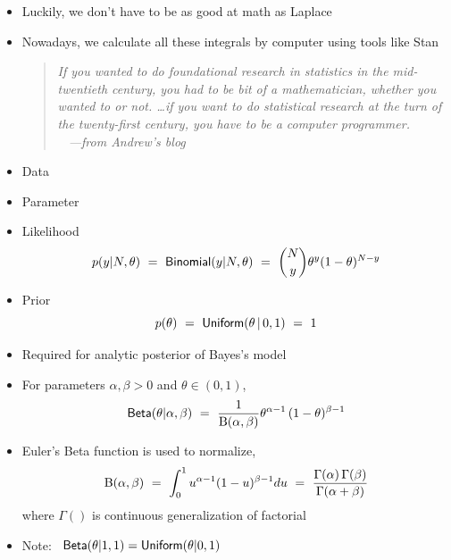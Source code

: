 \documentclass[10pt]{report}
\begin{document}
%
\begin{itemize}
\item Luckily, we don't have to be as good at math as Laplace
\item Nowadays, we calculate all these integrals by computer using
  tools like Stan
\vfill
\begin{quote}\slshape
  If you wanted to do foundational research in statistics in the
  mid-twentieth century, you had to be bit of a mathematician, whether
  you wanted to or not. \ldots if you want to do statistical research
  at the turn of the twenty-first century, you have to be a computer
  programmer.  \\[3pt] \mbox{ } \hfill {\small ---from Andrew's blog}
\end{quote}
\end{itemize}


%
\begin{itemize}
\item{Data}
\item Parameter
\item Likelihood
\[
p(y|N,\theta) 
\ = \ \text{\sf Binomial}(y|N,\theta) 
\ = \ \binom{N}{y} \theta^{y} (1 - \theta)^{N-y}
\]
\item Prior
\[
p(\theta) 
\ = \ \text{\sf Uniform}(\theta \, | \, 0,1) 
\ = \ 1
\]
\end{itemize}





%
\begin{itemize}
\item Required for analytic posterior of Bayes's model
\item For parameters $\alpha,\beta > 0$ and $\theta \in (0,1)$,
\[
\text{\sf Beta}(\theta|\alpha,\beta) 
\ = \ \frac{1}{{\text B}(\alpha,\beta)} 
      \theta^{\alpha - 1} \, 
      (1 - \theta)^{\beta-1}
\] 
\item Euler's Beta function is used to normalize,
\[
{\text B}(\alpha,\beta) 
\ = \ \int_0^1 u^{\alpha-1}(1-u)^{\beta-1} du
\ = \ \frac{\Gamma(\alpha)\,\Gamma(\beta)}{\Gamma(\alpha + \beta)}
\]
where $\Gamma()$ is continuous generalization of factorial
\item Note: \ $\text{\sf Beta}(\theta|1,1) = \text{\sf Uniform}(\theta|0,1)$
\end{itemize}
\end{document}
